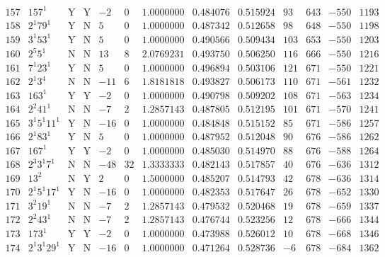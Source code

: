 \documentclass[11pt,reqno,a4letter]{article}
\numberwithin{equation}{section}
\numberwithin{figure}{section}
\numberwithin{table}{section}
\theoremstyle{plain}
\numberwithin{theorem}{section}
\theoremstyle{definition}
\begin{document}
\begin{table}[ht]
\begin{equation*}
{\begin{array}{cc|cc|ccc|cc|cccc}
 157 & 157^1 & \text{Y} & \text{Y} & -2 & 0 & 1.0000000 & 0.484076 & 0.515924 & 93 & 643 & -550 & 1193 \\
 158 & 2^1 79^1 & \text{Y} & \text{N} & 5 & 0 & 1.0000000 & 0.487342 & 0.512658 & 98 & 648 & -550 & 1198 \\
 159 & 3^1 53^1 & \text{Y} & \text{N} & 5 & 0 & 1.0000000 & 0.490566 & 0.509434 & 103 & 653 & -550 & 1203 \\
 160 & 2^5 5^1 & \text{N} & \text{N} & 13 & 8 & 2.0769231 & 0.493750 & 0.506250 & 116 & 666 & -550 & 1216 \\
 161 & 7^1 23^1 & \text{Y} & \text{N} & 5 & 0 & 1.0000000 & 0.496894 & 0.503106 & 121 & 671 & -550 & 1221 \\
 162 & 2^1 3^4 & \text{N} & \text{N} & -11 & 6 & 1.8181818 & 0.493827 & 0.506173 & 110 & 671 & -561 & 1232 \\
 163 & 163^1 & \text{Y} & \text{Y} & -2 & 0 & 1.0000000 & 0.490798 & 0.509202 & 108 & 671 & -563 & 1234 \\
 164 & 2^2 41^1 & \text{N} & \text{N} & -7 & 2 & 1.2857143 & 0.487805 & 0.512195 & 101 & 671 & -570 & 1241 \\
 165 & 3^1 5^1 11^1 & \text{Y} & \text{N} & -16 & 0 & 1.0000000 & 0.484848 & 0.515152 & 85 & 671 & -586 & 1257 \\
 166 & 2^1 83^1 & \text{Y} & \text{N} & 5 & 0 & 1.0000000 & 0.487952 & 0.512048 & 90 & 676 & -586 & 1262 \\
 167 & 167^1 & \text{Y} & \text{Y} & -2 & 0 & 1.0000000 & 0.485030 & 0.514970 & 88 & 676 & -588 & 1264 \\
 168 & 2^3 3^1 7^1 & \text{N} & \text{N} & -48 & 32 & 1.3333333 & 0.482143 & 0.517857 & 40 & 676 & -636 & 1312 \\
 169 & 13^2 & \text{N} & \text{Y} & 2 & 0 & 1.5000000 & 0.485207 & 0.514793 & 42 & 678 & -636 & 1314 \\
 170 & 2^1 5^1 17^1 & \text{Y} & \text{N} & -16 & 0 & 1.0000000 & 0.482353 & 0.517647 & 26 & 678 & -652 & 1330 \\
 171 & 3^2 19^1 & \text{N} & \text{N} & -7 & 2 & 1.2857143 & 0.479532 & 0.520468 & 19 & 678 & -659 & 1337 \\
 172 & 2^2 43^1 & \text{N} & \text{N} & -7 & 2 & 1.2857143 & 0.476744 & 0.523256 & 12 & 678 & -666 & 1344 \\
 173 & 173^1 & \text{Y} & \text{Y} & -2 & 0 & 1.0000000 & 0.473988 & 0.526012 & 10 & 678 & -668 & 1346 \\
 174 & 2^1 3^1 29^1 & \text{Y} & \text{N} & -16 & 0 & 1.0000000 & 0.471264 & 0.528736 & -6 & 678 & -684 & 1362 \\

\end{array}}
\end{equation*}
\end{table}
\end{document}
